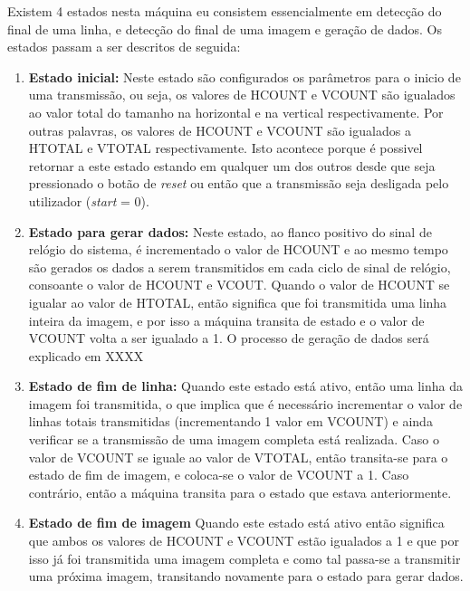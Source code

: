 Existem 4 estados nesta máquina eu consistem essencialmente em detecção do final de uma linha, e detecção do final de uma imagem e geração de dados. Os estados passam a ser descritos de seguida:

\begin{enumerate}
	\item \textbf{Estado inicial:} Neste estado são configurados os parâmetros para o inicio de uma transmissão, ou seja, os valores de HCOUNT e VCOUNT são igualados ao valor total do tamanho na horizontal e na vertical respectivamente. Por outras palavras, os valores de HCOUNT e VCOUNT são igualados a HTOTAL e VTOTAL respectivamente. Isto acontece porque é possivel retornar a este estado estando em qualquer um dos outros desde que seja pressionado o botão  de \textit{reset} ou então que a transmissão seja desligada pelo utilizador (\textit{start} = 0).
	\item \textbf{Estado para gerar dados:} Neste estado, ao flanco positivo do sinal de relógio do sistema, é incrementado o valor de HCOUNT e ao mesmo tempo são gerados os dados a serem transmitidos em cada ciclo de sinal de relógio, consoante o valor de HCOUNT e VCOUT. Quando o valor de HCOUNT se igualar ao valor de HTOTAL, então significa que foi transmitida uma linha inteira da imagem, e por isso a máquina transita de estado e o valor de VCOUNT volta a ser igualado a 1. O processo de geração de dados será explicado em XXXX
	\item \textbf{Estado de fim de linha:} Quando este estado está ativo, então uma linha da imagem foi transmitida, o que implica que é necessário incrementar o valor de linhas totais transmitidas (incrementando 1 valor em VCOUNT) e ainda verificar se a transmissão de uma imagem completa está realizada. Caso o valor de VCOUNT se iguale ao valor de VTOTAL, então transita-se para o estado de fim de imagem, e coloca-se o valor de VCOUNT a 1. Caso contrário, então a máquina transita para o estado que estava anteriormente.
	\item \textbf{Estado de fim de imagem} Quando este estado está ativo então significa que ambos os valores de HCOUNT e VCOUNT estão igualados a 1 e que por isso já foi transmitida uma imagem completa e como tal passa-se a transmitir uma próxima imagem, transitando novamente para o estado para gerar dados.
\end{enumerate}


